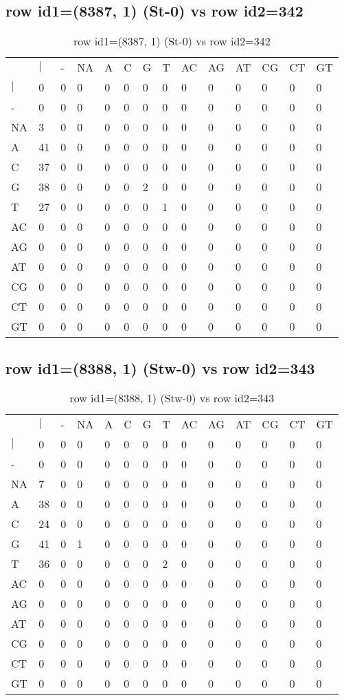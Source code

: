 \subsection{row id1=(8387, 1) (St-0) vs row id2=342}
\begin{center}
\begin{longtable}{|l|l|l|l|l|l|l|l|l|l|l|l|l|l|}
\caption{row id1=(8387, 1) (St-0) vs row id2=342} \label{table_dm630}\\
\hline
\\
\hline
&$|$&-&NA&A&C&G&T&AC&AG&AT&CG&CT&GT\\
$|$&0&0&0&0&0&0&0&0&0&0&0&0&0\\
-&0&0&0&0&0&0&0&0&0&0&0&0&0\\
NA&3&0&0&0&0&0&0&0&0&0&0&0&0\\
A&41&0&0&0&0&0&0&0&0&0&0&0&0\\
C&37&0&0&0&0&0&0&0&0&0&0&0&0\\
G&38&0&0&0&0&2&0&0&0&0&0&0&0\\
T&27&0&0&0&0&0&1&0&0&0&0&0&0\\
AC&0&0&0&0&0&0&0&0&0&0&0&0&0\\
AG&0&0&0&0&0&0&0&0&0&0&0&0&0\\
AT&0&0&0&0&0&0&0&0&0&0&0&0&0\\
CG&0&0&0&0&0&0&0&0&0&0&0&0&0\\
CT&0&0&0&0&0&0&0&0&0&0&0&0&0\\
GT&0&0&0&0&0&0&0&0&0&0&0&0&0\\
\hline
\end{longtable}
\end{center}

\subsection{row id1=(8388, 1) (Stw-0) vs row id2=343}
\begin{center}
\begin{longtable}{|l|l|l|l|l|l|l|l|l|l|l|l|l|l|}
\caption{row id1=(8388, 1) (Stw-0) vs row id2=343} \label{table_dm632}\\
\hline
\\
\hline
&$|$&-&NA&A&C&G&T&AC&AG&AT&CG&CT&GT\\
$|$&0&0&0&0&0&0&0&0&0&0&0&0&0\\
-&0&0&0&0&0&0&0&0&0&0&0&0&0\\
NA&7&0&0&0&0&0&0&0&0&0&0&0&0\\
A&38&0&0&0&0&0&0&0&0&0&0&0&0\\
C&24&0&0&0&0&0&0&0&0&0&0&0&0\\
G&41&0&1&0&0&0&0&0&0&0&0&0&0\\
T&36&0&0&0&0&0&2&0&0&0&0&0&0\\
AC&0&0&0&0&0&0&0&0&0&0&0&0&0\\
AG&0&0&0&0&0&0&0&0&0&0&0&0&0\\
AT&0&0&0&0&0&0&0&0&0&0&0&0&0\\
CG&0&0&0&0&0&0&0&0&0&0&0&0&0\\
CT&0&0&0&0&0&0&0&0&0&0&0&0&0\\
GT&0&0&0&0&0&0&0&0&0&0&0&0&0\\
\hline
\end{longtable}
\end{center}


